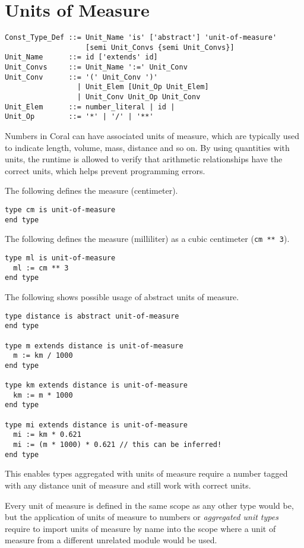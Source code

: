 \section{Units of Measure}
\label{sec:units-of-measure}

\syntax\begin{lstlisting}
Const_Type_Def ::= Unit_Name 'is' ['abstract'] 'unit-of-measure' 
                   [semi Unit_Convs {semi Unit_Convs}]
Unit_Name      ::= id ['extends' id]
Unit_Convs     ::= Unit_Name ':=' Unit_Conv
Unit_Conv      ::= '(' Unit_Conv ')'
                 | Unit_Elem [Unit_Op Unit_Elem]
                 | Unit_Conv Unit_Op Unit_Conv
Unit_Elem      ::= number_literal | id |
Unit_Op        ::= '*' | '/' | '**'
\end{lstlisting}

Numbers in Coral can have associated units of measure, which are typically used to indicate length, volume, mass, distance and so on. By using quantities with units, the runtime is allowed to verify that arithmetic relationships have the correct units, which helps prevent programming errors. 

\example The following defines the measure  (centimeter).
\begin{lstlisting}
type cm is unit-of-measure
end type
\end{lstlisting}

\example The following defines the measure  (milliliter) as a cubic centimeter (\lstinline!cm ** 3!).
\begin{lstlisting}
type ml is unit-of-measure
  ml := cm ** 3
end type
\end{lstlisting}

\example The following shows possible usage of abstract units of measure. 
\begin{lstlisting}
type distance is abstract unit-of-measure
end type

type m extends distance is unit-of-measure
  m := km / 1000
end type

type km extends distance is unit-of-measure
  km := m * 1000
end type

type mi extends distance is unit-of-measure
  mi := km * 0.621
  mi := (m * 1000) * 0.621 // this can be inferred!
end type
\end{lstlisting}
This enables types aggregated with units of measure require a number tagged with any distance unit of measure and still work with correct units. 

Every unit of measure is defined in the same scope as any other type would be, but the application of units of measure to numbers or {\em aggregated unit types} require to import units of measure by name into the scope where a unit of measure from a different unrelated module would be used. 

